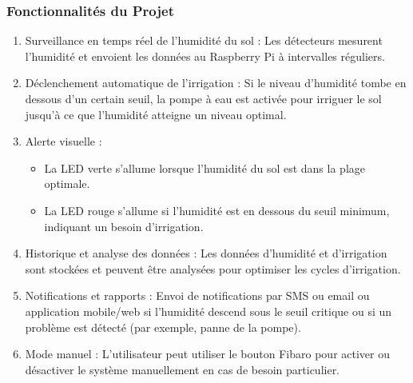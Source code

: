 \documentclass[a4paper ,10pt]{article}
\begin{document}
\subsubsection*{Fonctionnalités du Projet}

\begin{enumerate}
  \item Surveillance en temps réel de l'humidité du sol : Les détecteurs mesurent l'humidité et envoient les données au Raspberry Pi à intervalles réguliers.
  \item Déclenchement automatique de l'irrigation : Si le niveau d'humidité tombe en dessous d'un certain seuil, la pompe à eau est activée pour irriguer le sol jusqu'à ce que l'humidité atteigne un niveau optimal.
  \item Alerte visuelle :
        \begin{itemize}
          \item La LED verte s'allume lorsque l'humidité du sol est dans la plage optimale.
          \item La LED rouge s'allume si l'humidité est en dessous du seuil minimum, indiquant un besoin d'irrigation.
        \end{itemize}
  \item Historique et analyse des données : Les données d'humidité et d'irrigation sont stockées et peuvent être analysées pour optimiser les cycles d'irrigation.
  \item Notifications et rapports : Envoi de notifications par SMS ou email ou application mobile/web si l'humidité descend sous le seuil critique ou si un problème est détecté (par exemple, panne de la pompe).
  \item Mode manuel : L'utilisateur peut utiliser le bouton Fibaro pour activer ou désactiver le système manuellement en cas de besoin particulier.
\end{enumerate}
\end{document}
